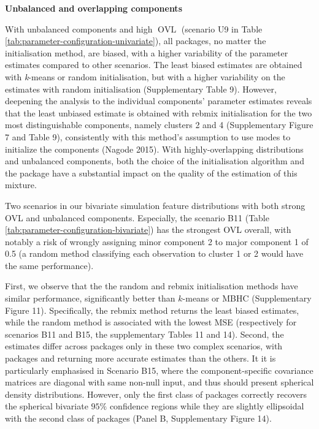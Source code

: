 \textbf{Unbalanced and overlapping components}

With unbalanced components and high \(\operatorname{OVL}\) (scenario U9 in Table
\ref{tab:parameter-configuration-univariate}), all packages, no
matter the initialisation method, are biased, with a higher variability
of the parameter estimates compared to other scenarios. The least biased
estimates are obtained with \emph{k}-means or random initialisation, but with
a higher variability on the estimates with random initialisation (Supplementary Table 9).
However, deepening the analysis to the individual components' parameter estimates
reveals that the least unbiased estimate is obtained with rebmix initialisation
for the two most distinguishable components, namely clusters 2 and 4 (Supplementary Figure 7 and
Table 9), consistently with this method's assumption to use modes to initialize the components (Nagode 2015). With highly-overlapping distributions and unbalanced components, both the choice of the initialisation algorithm and the package have a
substantial impact on the quality of the estimation of this mixture.

Two scenarios in our bivariate simulation feature distributions with both strong OVL and unbalanced components. Especially, the scenario B11 (Table \ref{tab:parameter-configuration-bivariate}) has the strongest OVL overall, with notably a risk of wrongly assigning minor component 2 to major component 1 of 0.5 (a random method classifying each observation to cluster 1 or 2 would have the same performance).

First, we observe that the the random and rebmix initialisation methods have similar performance, significantly better than \(k\)-means or MBHC (Supplementary Figure 11). Specifically, the rebmix method returns the least biased estimates, while the random method is associated with the lowest MSE (respectively for scenarios B11 and B15, the supplementary Tables 11
and 14). Second, the estimates differ across packages only in these two complex scenarios, with packages  and  returning more accurate estimates than the others.
It it is particularly emphasised in Scenario B15, where the component-specific covariance matrices are diagonal with same non-null input, and thus should present spherical density distributions. However, only the first class of packages correctly recovers the spherical bivariate \(95\%\) confidence regions while they are slightly ellipsoidal with the second class of packages (Panel B, Supplementary Figure 14).

